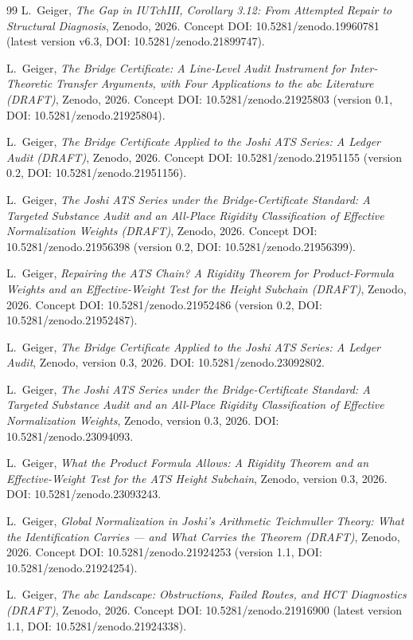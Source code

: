 \documentclass[11pt,a4paper]{article}
\begin{document}
\begin{thebibliography}{99}
L.~Geiger,
\emph{The Gap in IUTchIII, Corollary 3.12: From Attempted Repair to
Structural Diagnosis},
Zenodo, 2026.
Concept DOI: 10.5281/zenodo.19960781
(latest version v6.3, DOI: 10.5281/zenodo.21899747).

L.~Geiger,
\emph{The Bridge Certificate: A Line-Level Audit Instrument for
Inter-Theoretic Transfer Arguments, with Four Applications to the abc
Literature (DRAFT)},
Zenodo, 2026.
Concept DOI: 10.5281/zenodo.21925803
(version 0.1, DOI: 10.5281/zenodo.21925804).

L.~Geiger,
\emph{The Bridge Certificate Applied to the Joshi ATS Series:
A Ledger Audit (DRAFT)},
Zenodo, 2026.
Concept DOI: 10.5281/zenodo.21951155
(version 0.2, DOI: 10.5281/zenodo.21951156).

L.~Geiger,
\emph{The Joshi ATS Series under the Bridge-Certificate Standard:
A Targeted Substance Audit and an All-Place Rigidity Classification of
Effective Normalization Weights (DRAFT)},
Zenodo, 2026.
Concept DOI: 10.5281/zenodo.21956398
(version 0.2, DOI: 10.5281/zenodo.21956399).

L.~Geiger,
\emph{Repairing the ATS Chain? A Rigidity Theorem for Product-Formula
Weights and an Effective-Weight Test for the Height Subchain (DRAFT)},
Zenodo, 2026.
Concept DOI: 10.5281/zenodo.21952486
(version 0.2, DOI: 10.5281/zenodo.21952487).

L.~Geiger,
\emph{The Bridge Certificate Applied to the Joshi ATS Series: A Ledger Audit},
Zenodo, version 0.3, 2026. DOI: 10.5281/zenodo.23092802.

L.~Geiger,
\emph{The Joshi ATS Series under the Bridge-Certificate Standard:
A Targeted Substance Audit and an All-Place Rigidity Classification
of Effective Normalization Weights},
Zenodo, version 0.3, 2026. DOI: 10.5281/zenodo.23094093.

L.~Geiger,
\emph{What the Product Formula Allows: A Rigidity Theorem and
an Effective-Weight Test for the ATS Height Subchain},
Zenodo, version 0.3, 2026. DOI: 10.5281/zenodo.23093243.

L.~Geiger,
\emph{Global Normalization in Joshi's Arithmetic Teichmuller Theory:
What the Identification Carries --- and What Carries the Theorem
(DRAFT)},
Zenodo, 2026.
Concept DOI: 10.5281/zenodo.21924253
(version 1.1, DOI: 10.5281/zenodo.21924254).

L.~Geiger,
\emph{The abc Landscape: Obstructions, Failed Routes, and HCT
Diagnostics (DRAFT)},
Zenodo, 2026.
Concept DOI: 10.5281/zenodo.21916900
(latest version 1.1, DOI: 10.5281/zenodo.21924338).


\end{thebibliography}
\end{document}
